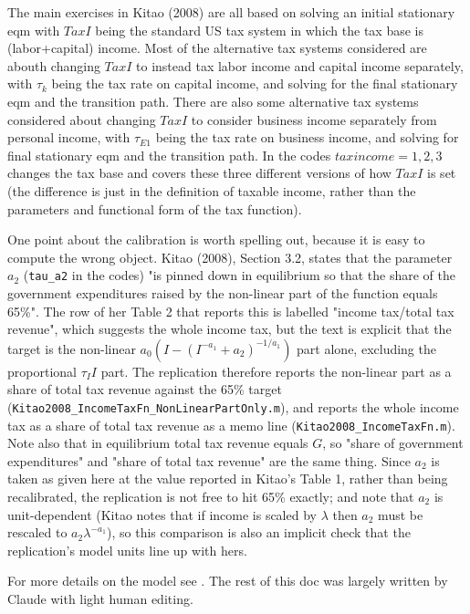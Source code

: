 \documentclass[11pt,fleqn]{article}
\begin{document}
The main exercises in Kitao (2008) are all based on solving an initial stationary eqm with $TaxI$ being the standard US tax system in which the tax base is (labor+capital) income. Most of the alternative tax systems considered are abouth changing $TaxI$ to instead tax labor income and capital income separately, with $\tau_k$ being the tax rate on capital income, and solving for the final stationary eqm and the transition path. There are also some alternative tax systems considered about changing $TaxI$ to consider business income separately from personal income, with $\tau_{E1}$ being the tax rate on business income, and solving for final stationary eqm and the transition path. In the codes $taxincome=1,2,3$ changes the tax base and covers these three different versions of how $TaxI$ is set (the difference is just in the definition of taxable income, rather than the parameters and functional form of the tax function).

One point about the calibration is worth spelling out, because it is easy to compute the wrong object. Kitao (2008), Section 3.2, states that the parameter $a_2$ (\texttt{tau\_a2} in the codes) "is pinned down in equilibrium so that the share of the government expenditures raised by the non-linear part of the function equals 65\%". The row of her Table 2 that reports this is labelled "income tax/total tax revenue", which suggests the whole income tax, but the text is explicit that the target is the non-linear $a_0 \left( I - (I^{-a_1}+a_2)^{-1/a_1} \right)$ part alone, excluding the proportional $\tau_I I$ part. The replication therefore reports the non-linear part as a share of total tax revenue against the 65\% target (\texttt{Kitao2008\_IncomeTaxFn\_NonLinearPartOnly.m}), and reports the whole income tax as a share of total tax revenue as a memo line (\texttt{Kitao2008\_IncomeTaxFn.m}). Note also that in equilibrium total tax revenue equals $G$, so "share of government expenditures" and "share of total tax revenue" are the same thing. Since $a_2$ is taken as given here at the value reported in Kitao's Table 1, rather than being recalibrated, the replication is not free to hit 65\% exactly; and note that $a_2$ is unit-dependent (Kitao notes that if income is scaled by $\lambda$ then $a_2$ must be rescaled to $a_2 \lambda^{-a_1}$), so this comparison is also an implicit check that the replication's model units line up with hers.

For more details on the model see \cite*{Kitao2008}.  The rest of this doc was largely written by Claude with light human editing.
\end{document}
